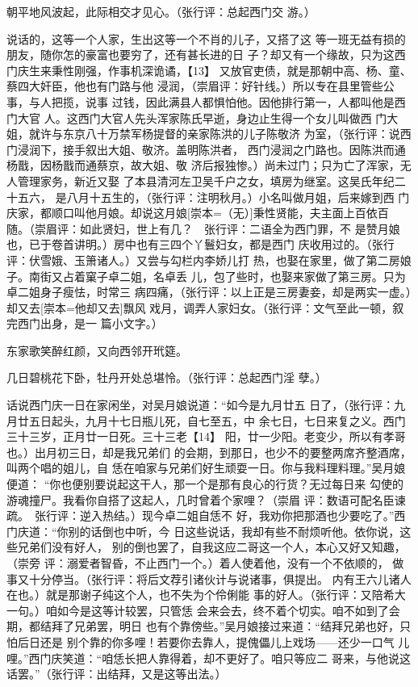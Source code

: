 \documentclass[UTF8,scheme=chinese,11pt,linespread=1.4]{ctexbook}
\makeatletter
\newcommand{\banben}[2][]{#2}
\newenvironment{diben}[1]
  {\list{}{\listparindent 2em
    \itemindent\listparindent
    \rightmargin 0em  %
    \leftmargin 0em  %
    \parsep \z@ \@plus\p@}%
   \item\relax}
  {\endlist}
\makeatother
\begin{document}
\begin{diben}
一朝平地风波起，此际相交才见心。（张行评：总起西门交
游。）

说话的，这等一个人家，生出这等一个不肖的儿子，又搭了这
等一班无益有损的朋友，随你怎的豪富也要穷了，还有甚长进的日
子？却又有一个缘故，只为这西门庆生来秉性刚强，作事机深诡谲，【13】
又放官吏债，就是那朝中高、杨、童、蔡四大奸臣，他也有门路与他
浸润，（崇眉评：好针线。）所以专在县里管些公事，与人把揽，说事
过钱，因此满县人都惧怕他。因他排行第一，人都叫他是西门大官
人。这西门大官人先头浑家陈氏早逝，身边止生得一个女儿叫做西
门大姐，就许与东京八十万禁军杨提督的亲家陈洪的儿子陈敬济
为室，（张行评：说西门浸润下，接手叙出大姐、敬济。盖明陈洪者，
西门浸润之门路也。因陈洪而通杨戬，因杨戬而通蔡京，故大姐、敬
济后报独惨。）尚未过门；只为亡了浑家，无人管理家务，新近又娶
了本县清河左卫吴千户之女，填房为继室。这吴氏年纪二十五六，
是八月十五生的，（张行评：注明秋月。）小名叫做月姐，后来嫁到西
门庆家，都顺口叫他月娘。\banben{却说这月娘}[崇本={（无）}]秉性贤能，夫主面上百依百
随。（崇眉评：如此贤妇，世上有几？　张行评：二语全为西门罪，不
是赞月娘也，已于卷首讲明。）房中也有三四个丫鬟妇女，都是西门
庆收用过的。（张行评：伏雪娥、玉箫诸人。）又尝与勾栏内李娇儿打
热，也娶在家里，做了第二房娘子。南街又占着窠子卓二姐，名卓丢
儿，包了些时，也娶来家做了第三房。只为卓二姐身子瘦怯，时常三
病四痛，（张行评：以上正是三房妻妾，却是两实一虚。）\banben{却又去}[崇本={他却又去}]飘风
戏月，调弄人家妇女。（张行评：文气至此一顿，叙完西门出身，是一
篇小文字。）

东家歌笑醉红颜，又向西邻开玳筵。

几日碧桃花下卧，牡丹开处总堪怜。（张行评：总起西门淫
孽。）

话说西门庆一日在家闲坐，对吴月娘说道：“如今是九月廿五
日了，（张行评：九月廿五日起头，九月十七日瓶儿死，自七至五，中
余七日，七日来复之义。西门三十三岁，正月廿一日死。三十三老【14】
阳，廿一少阳。老变少，所以有孝哥也。）出月初三日，却是我兄弟们
的会期，到那日，也少不的要整两席齐整酒席，叫两个唱的姐儿，自
恁在咱家与兄弟们好生顽耍一日。你与我料理料理。”吴月娘便道：
“你也便别要说起这干人，那一个是那有良心的行货？无过每日来
勾使的游魂撞尸。我看你自搭了这起人，几时曾着个家哩？（崇眉
评：数语可配名臣谏疏。　张行评：逆入热结。）现今卓二姐自恁不
好，我劝你把那酒也少要吃了。”西门庆道：“你别的话倒也中听，今
日这些说话，我却有些不耐烦听他。依你说，这些兄弟们没有好人，
别的倒也罢了，自我这应二哥这一个人，本心又好又知趣，（崇旁
评：溺爱者智昏，不止西门一个。）着人使着他，没有一个不依顺的，
做事又十分停当。（张行评：将后文荐引诸伙计与说诸事，俱提出。
内有王六儿诸人在也。）就是那谢子纯这个人，也不失为个伶俐能
事的好人。（张行评：又陪希大一句。）咱如今是这等计较罢，只管恁
会来会去，终不着个切实。咱不如到了会期，都结拜了兄弟罢，明日
也有个靠傍些。”吴月娘接过来道：“结拜兄弟也好，只怕后日还是
别个靠的你多哩！若要你去靠人，提傀儡儿上戏场——还少一口气
儿哩。”西门庆笑道：“咱恁长把人靠得着，却不更好了。咱只等应二
哥来，与他说这话罢。”（张行评：出结拜，又是这等出法。）


\end{diben}
\end{document}
